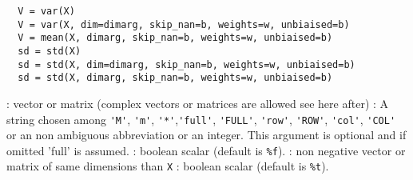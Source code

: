
\begin{mandesc}
\end{mandesc}

\begin{calling_sequence}
\begin{verbatim}
  V = var(X)
  V = var(X, dim=dimarg, skip_nan=b, weights=w, unbiaised=b)  
  V = mean(X, dimarg, skip_nan=b, weights=w, unbiaised=b)  
  sd = std(X)
  sd = std(X, dim=dimarg, skip_nan=b, weights=w, unbiaised=b)  
  sd = std(X, dimarg, skip_nan=b, weights=w, unbiaised=b)  
\end{verbatim}
\end{calling_sequence}
\begin{parameters}
  \begin{varlist}
    : vector or matrix (complex vectors or matrices are allowed see here after)
    : A string chosen among \verb+'M'+, \verb+'m'+, \verb+'*'+,\verb+'full'+, \verb+'FULL'+, \verb+'row'+,
    \verb+'ROW'+, \verb+'col'+, \verb+'COL'+ or an non ambiguous abbreviation or an integer. 
    This argument is optional and if omitted 'full' is assumed.
    : boolean scalar (default is \verb+%f+).
    : non negative vector or matrix of same dimensions than \verb+X+ 
    :  boolean scalar (default is \verb+%t+).
  \end{varlist}
\end{parameters}

